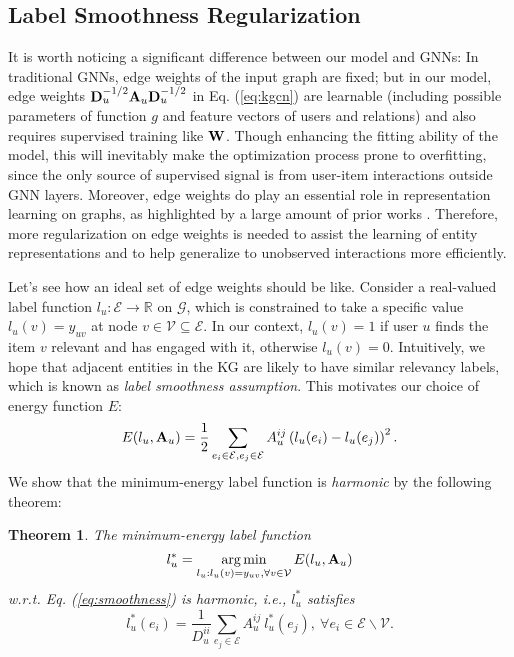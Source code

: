 \documentclass[sigconf]{acmart}
\newtheorem{theorem}{Theorem}
\begin{document}
	\subsection{Label Smoothness Regularization}
		It is worth noticing a significant difference between our model and GNNs: In traditional GNNs, edge weights of the input graph are fixed; but in our model, edge weights ${\bf D}_u^{-1/2} {\bf A}_u {\bf D}_u^{-1/2}$ in Eq. (\ref{eq:kgcn}) are learnable (including possible parameters of function $g$ and feature vectors of users and relations) and also requires supervised training like $\bf W$.
		Though enhancing the fitting ability of the model, this will inevitably make the optimization process prone to overfitting, since the only source of supervised signal is from user-item interactions outside GNN layers.
		Moreover, edge weights do play an essential role in representation learning on graphs, as highlighted by a large amount of prior works \cite{zhu2003semi,zhang2007hyperparameter,wang2008label,karasuyama2013manifold,velickovic2017graph}.
		Therefore, more regularization on edge weights is needed to assist the learning of entity representations and to help generalize to unobserved interactions more efficiently.
		
		Let's see how an ideal set of edge weights should be like.
		Consider a real-valued label function $l_u: \mathcal E \rightarrow \mathbb R$ on $\mathcal G$, which is constrained to take a specific value $l_u(v) = y_{uv}$ at node $v \in \mathcal V \subseteq \mathcal E$.
		In our context, $l_u(v) = 1$ if user $u$ finds the item $v$ relevant and has engaged with it, otherwise $l_u(v) = 0$.
		Intuitively, we hope that adjacent entities in the KG are likely to have similar relevancy labels, which is known as \textit{label smoothness assumption}.
		This motivates our choice of energy function $E$:
		\begin{equation}
		\label{eq:smoothness}
			E(l_u, {\bf A}_u) = \frac{1}{2} \sum_{e_i \in \mathcal E, e_j \in \mathcal E} A_u^{ij} \left( l_u(e_i) - l_u(e_j) \right)^2.
		\end{equation}
		We show that the minimum-energy label function is \textit{harmonic} by the following theorem:
		
		\begin{theorem}
		\label{thm:1}
			The minimum-energy label function
			\begin{equation}
				l_u^* = \mathop{\arg\min}_{l_u: l_u(v) = y_{uv}, \forall v \in \mathcal V} E(l_u, {\bf A}_u)
			\end{equation}
			w.r.t. Eq. (\ref{eq:smoothness}) is harmonic, i.e., $l_u^*$ satisfies
			\begin{equation}
				l_u^*(e_i) = \frac{1}{D_u^{ii}} \sum_{e_j \in \mathcal E} A_u^{ij} \ l_u^*(e_j), \ \forall e_i \in \mathcal E \backslash \mathcal V.
			\end{equation}
		\end{theorem}
		
\end{document}
